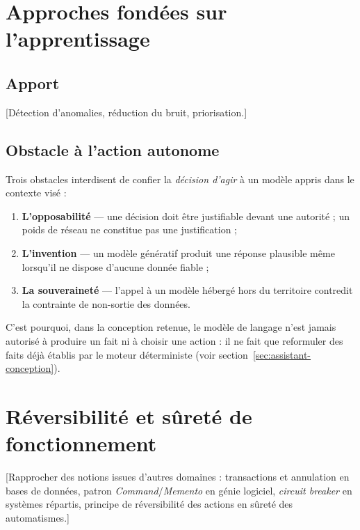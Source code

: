
\section{Approches fond\'ees sur l'apprentissage}
\subsection{Apport}
[D\'etection d'anomalies, r\'eduction du bruit, priorisation.]

\subsection{Obstacle \`a l'action autonome}
Trois obstacles interdisent de confier la \emph{d\'ecision d'agir} \`a un mod\`ele
appris dans le contexte vis\'e :

\begin{enumerate}
  \item \textbf{L'opposabilit\'e} --- une d\'ecision doit \^etre justifiable devant une
        autorit\'e ; un poids de r\'eseau ne constitue pas une justification ;
  \item \textbf{L'invention} --- un mod\`ele g\'en\'eratif produit une r\'eponse
        plausible m\^eme lorsqu'il ne dispose d'aucune donn\'ee fiable ;
  \item \textbf{La souverainet\'e} --- l'appel \`a un mod\`ele h\'eberg\'e hors du territoire
        contredit la contrainte de non-sortie des donn\'ees.
\end{enumerate}

C'est pourquoi, dans la conception retenue, le mod\`ele de langage n'est jamais
autoris\'e \`a produire un fait ni \`a choisir une action : il ne fait que reformuler
des faits d\'ej\`a \'etablis par le moteur d\'eterministe (voir
section~\ref{sec:assistant-conception}).

\section{R\'eversibilit\'e et s\^uret\'e de fonctionnement}
[Rapprocher des notions issues d'autres domaines : transactions et annulation en
bases de donn\'ees, patron \emph{Command}/\emph{Memento} en g\'enie logiciel,
\emph{circuit breaker} en syst\`emes r\'epartis, principe de r\'eversibilit\'e des
actions en s\^uret\'e des automatismes.]

